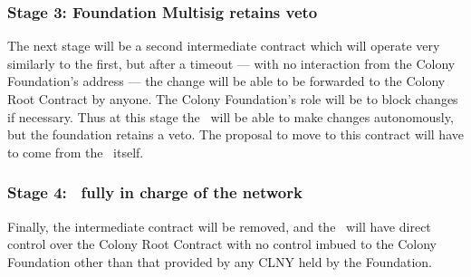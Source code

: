 \subsubsection*{Stage 3: Foundation Multisig retains veto}
The next stage will be a second intermediate contract which will operate very similarly to the first, but after a timeout --- with no interaction from the Colony Foundation's address --- the change will be able to be forwarded to the Colony Root Contract by anyone. The Colony Foundation's role will be to block changes if necessary. Thus at this stage the \rc\ will be able to make changes autonomously, but the foundation retains a veto.  The proposal to move to this contract will have to come from the \rc\ itself. 

\subsubsection*{Stage 4: \rc\ fully in charge of the network}
Finally, the intermediate contract will be removed, and the \rc\ will have direct control over the Colony Root Contract with no control imbued to the Colony Foundation other than that provided by any CLNY held by the Foundation. 

